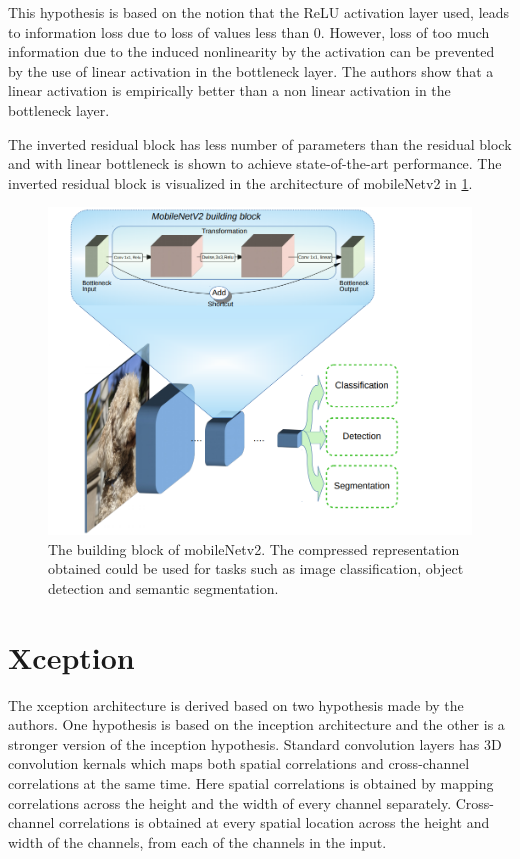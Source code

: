 This hypothesis is based on the notion that the ReLU activation layer used, leads to information loss due to loss of values less than 0. However, loss of too much information due to the induced nonlinearity by the activation can be prevented by the use of linear activation in the bottleneck layer. The authors show that a linear activation is empirically better than a non linear activation in the bottleneck layer.

The inverted residual block has less number of parameters than the residual block and with linear bottleneck is shown to achieve state-of-the-art performance. The inverted residual block is visualized in the architecture of mobileNetv2 in \ref{Fig:mobileNetv2bb}.

	\begin{figure}
		\centering
		\includegraphics[width=.7\linewidth]{images/mobileNetv2_bb}
		\caption{The building block of mobileNetv2. The compressed representation obtained could be used for tasks such as image classification, object detection and semantic segmentation.}
		\label{Fig:mobileNetv2bb}
	\end{figure}

\section{Xception}
\label{section:xcep}

The xception architecture is derived based on two hypothesis made by the authors. One hypothesis is based on the inception architecture and the other is a stronger version of the inception hypothesis. Standard convolution layers has 3D convolution kernals which maps both spatial correlations and cross-channel correlations at the same time. Here spatial correlations is obtained by mapping correlations across the height and the width of every channel separately. Cross-channel correlations is obtained at every spatial location across the height and width of the channels, from each of the channels in the input. 

